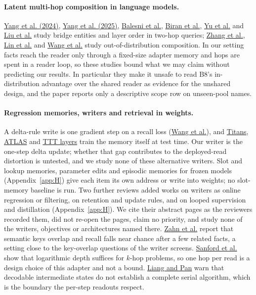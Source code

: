 \paragraph{Latent multi-hop composition in language models.}
\href{https://arxiv.org/abs/2402.16837}{Yang et al. (2024)}, \href{https://arxiv.org/abs/2411.16679}{Yang et al. (2025)}, \href{https://arxiv.org/abs/2411.16353}{Balesni et al.}, \href{https://arxiv.org/abs/2406.12775}{Biran et al.}, \href{https://arxiv.org/abs/2502.10835}{Yu et al.} and \href{https://arxiv.org/abs/2601.03542}{Liu et al.} study bridge entities and layer order in two-hop queries; \href{https://arxiv.org/abs/2608.07261}{Zhang et al.}, \href{https://arxiv.org/abs/2509.24653}{Lin et al.} and \href{https://arxiv.org/abs/2405.15071}{Wang et al.} study out-of-distribution composition.
In our setting facts reach the reader only through a fixed-size adapter memory and hops are spent in a reader loop, so these studies bound what we may claim without predicting our results.
In particular they make it unsafe to read B8's in-distribution advantage over the shared reader as evidence for the unshared design, and the paper reports only a descriptive scope row on unseen-pool names.  %

\paragraph{Regression memories, writers and retrieval in weights.}
A delta-rule write is one gradient step on a recall loss (\href{https://arxiv.org/abs/2501.12352}{Wang et al.}), and \href{https://arxiv.org/abs/2501.00663}{Titans}, \href{https://arxiv.org/abs/2505.23735}{ATLAS} and \href{https://arxiv.org/abs/2407.04620}{TTT layers} train the memory itself at test time.
Our writer is the one-step delta update; whether that gap contributes to the deployed-read distortion is untested, and we study none of these alternative writers.  %
Slot and lookup memories, parameter edits and episodic memories for frozen models (Appendix~\ref{app:H}) give each item its own address or write into weights; no slot-memory baseline is run.
Two further reviews added works on writers as online regression or filtering, on retention and update rules, and on looped supervision and distillation (Appendix~\ref{app:H}).
We cite their abstract pages as the reviewers recorded them, did not re-open the pages, claim no priority, and study none of the writers, objectives or architectures named there.
\href{https://arxiv.org/abs/2601.15313}{Zahn et al.} report that semantic keys overlap and recall falls near chance after a few related facts, a setting close to the key-overlap questions of the writer screens.
\href{https://arxiv.org/abs/2402.09268}{Sanford et al.} show that logarithmic depth suffices for $k$-hop problems, so one hop per read is a design choice of this adapter and not a bound.
\href{https://arxiv.org/abs/2602.00449}{Liang and Pan} warn that decodable intermediate states do not establish a complete serial algorithm, which is the boundary the per-step readouts respect.  %

